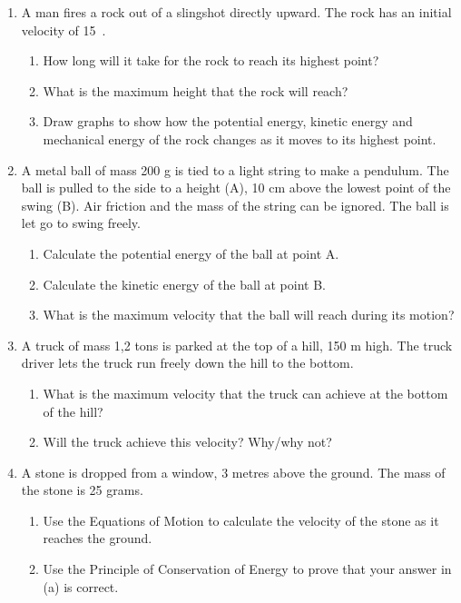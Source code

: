 \begin{enumerate}
\item{A man fires a rock out of a slingshot directly upward. The rock has an initial velocity of 15~\ms. 
	\begin{enumerate}
	\item How long will it take for the rock to reach its highest point?
	\item What is the maximum height that the rock will reach?
	\item Draw graphs to show how the potential energy, kinetic energy and mechanical energy of the rock changes as it moves to its highest point.
	\end{enumerate}}

\item {A metal ball of mass 200 g is tied to a light string to make a pendulum. The ball is pulled to the side to a height (A), 10 cm above the lowest point of the swing (B). Air friction and the mass of the string can be ignored. The ball is let go to swing freely.
	\begin{enumerate}
	\item Calculate the potential energy of the ball at point A.
	\item Calculate the kinetic energy of the ball at point B.
	\item What is the maximum velocity that the ball will reach during its motion?
	\end{enumerate}}

\item {A truck of mass 1,2 tons is parked at the top of a hill, 150 m high. The truck driver lets the truck run freely down the hill to the bottom. 
	\begin{enumerate}
	\item What is the maximum velocity that the truck can achieve at the bottom of the hill?
	\item Will the truck achieve this velocity? Why/why not?
	\end{enumerate}}
	
\item {A stone is dropped from a window, 3 metres above the ground. The mass of the stone is 25 grams. 
	\begin{enumerate}
	\item Use the Equations of Motion to calculate the velocity of the stone as it reaches the ground.
	\item Use the Principle of Conservation of Energy to prove that your answer in (a) is correct.
	\end{enumerate}}
	
\end{enumerate}


